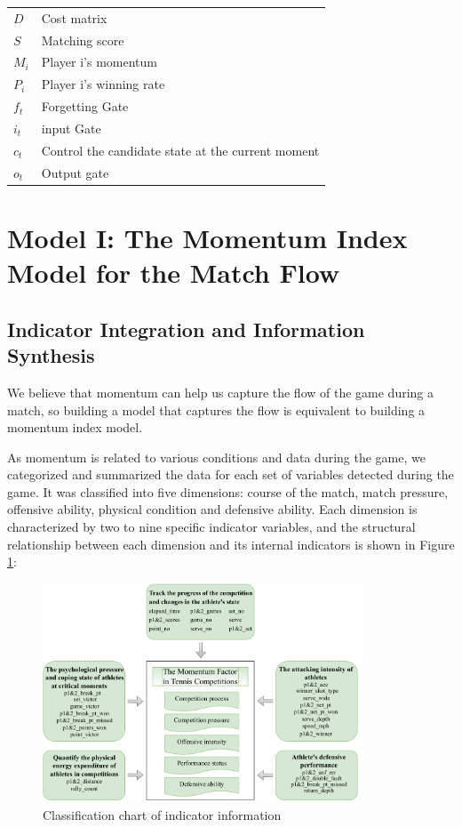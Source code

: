 \documentclass[12pt]{article}  %
\begin{document}
\begin{table}[htbp]
\begin{tabular}{m{4cm}<{\centering}m{10cm}<{\centering}}
    $D$ & Cost matrix \\[0.5ex]
    $S$ & Matching score \\[0.5ex]
    $M_{i}$ & Player i's momentum \\[0.5ex]
    $P_{i}$ & Player i's winning rate \\[0.5ex]
    $f_{t}$ & Forgetting Gate \\[0.5ex]
    $i_{t}$ & input Gate \\[0.5ex]
    $c_{t}$ & Control the candidate state at the current moment \\[0.5ex]
    $o_{t}$ & Output gate \\[0.5ex]
    \bottomrule[2.5pt]
    \end{tabular}
\end{table}
    

\section{Model I: The Momentum Index Model for the Match Flow}

\subsection{Indicator Integration and Information Synthesis}
We believe that momentum can help us capture the flow of the game during a match, so building a model that captures the flow is equivalent to building a momentum index model.

As momentum is related to various conditions and data during the game, we categorized and summarized the data for each set of variables detected during the game. It was classified into five dimensions: course of the match, match pressure, offensive ability, physical condition and defensive ability. Each dimension is characterized by two to nine specific indicator variables, and the structural relationship between each dimension and its internal indicators is shown in Figure \ref{fig:m1_work}:

\begin{figure}[h] %
	\centering %
	\includegraphics[width=0.85\textwidth]{picture/第一问的指标.pdf} %
	\caption{Classification chart of indicator information} %
	\label{fig:m1_work} %
\end{figure}
\FloatBarrier
\end{document}
